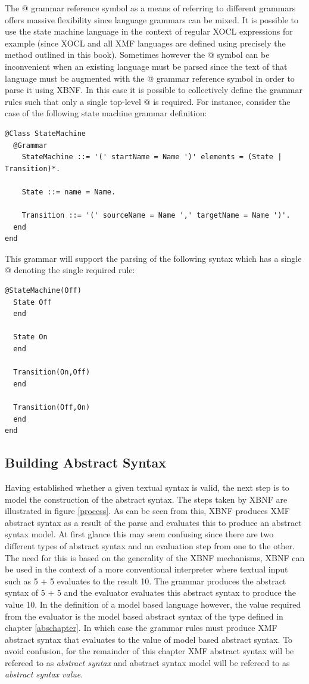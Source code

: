 The @ grammar reference symbol as a means of referring to different grammars offers massive flexibility since language grammars can be mixed.  It is possible to use the state machine language in the context of regular XOCL expressions for example (since XOCL and all XMF languages are defined using precisely the method outlined in this book).  Sometimes however the @ symbol can be inconvenient when an existing language must be parsed since the text of that language must be augmented with the @ grammar reference symbol in order to parse it using XBNF.  In this case it is possible to collectively define the grammar rules such that only a single top-level @ is required.  For instance, consider the case of the following state machine grammar definition:

\begin{lstlisting}
@Class StateMachine
  @Grammar
    StateMachine ::= '(' startName = Name ')' elements = (State | Transition)*.

    State ::= name = Name.

    Transition ::= '(' sourceName = Name ',' targetName = Name ')'.
  end
end
\end{lstlisting}\noindent This grammar will support the parsing of the following syntax which has a single @ denoting the single required rule:

\begin{lstlisting}
@StateMachine(Off)
  State Off
  end

  State On
  end

  Transition(On,Off)
  end

  Transition(Off,On)
  end
end
\end{lstlisting}\subsection{Building Abstract Syntax}

Having established whether a given textual syntax is valid, the next step is to model the construction of the abstract syntax.  The steps taken by XBNF are illustrated in figure \ref{process}.  As can be seen from this, XBNF produces XMF abstract syntax as a result of the parse and evaluates this to produce an abstract syntax model.  At first glance this may seem confusing since there are two different types of abstract syntax and an evaluation step from one to the other.  The need for this is based on the generality of the XBNF mechanisms, XBNF can be used in the context of a more conventional interpreter where textual input such as 5 + 5 evaluates to the result 10.  The grammar produces the abstract syntax of 5 + 5 and the evaluator evaluates this abstract syntax to produce the value 10.  In the definition of a model based language however, the value required from the evaluator is the model based abstract syntax of the type defined in chapter \ref{abschapter}.  In which case the grammar rules must produce XMF abstract syntax that evaluates to the value of model based abstract syntax.  To avoid confusion, for the remainder of this chapter XMF abstract syntax will be refereed to as \emph{abstract syntax} and abstract syntax model will be refereed to as \emph{abstract syntax value}.

